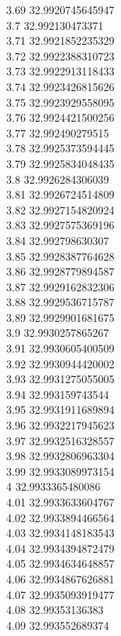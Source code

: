 {3.69	32.9920745645947\\
3.7	32.992130473371\\
3.71	32.9921852235329\\
3.72	32.9922388310723\\
3.73	32.9922913118433\\
3.74	32.9923426815626\\
3.75	32.9923929558095\\
3.76	32.9924421500256\\
3.77	32.992490279515\\
3.78	32.9925373594445\\
3.79	32.9925834048435\\
3.8	32.9926284306039\\
3.81	32.9926724514809\\
3.82	32.9927154820924\\
3.83	32.9927575369196\\
3.84	32.992798630307\\
3.85	32.9928387764628\\
3.86	32.9928779894587\\
3.87	32.9929162832306\\
3.88	32.9929536715787\\
3.89	32.9929901681675\\
3.9	32.9930257865267\\
3.91	32.9930605400509\\
3.92	32.9930944420002\\
3.93	32.9931275055005\\
3.94	32.993159743544\\
3.95	32.9931911689894\\
3.96	32.9932217945623\\
3.97	32.9932516328557\\
3.98	32.9932806963304\\
3.99	32.9933089973154\\
4	32.9933365480086\\
4.01	32.9933633604767\\
4.02	32.9933894466564\\
4.03	32.9934148183543\\
4.04	32.9934394872479\\
4.05	32.9934634648857\\
4.06	32.9934867626881\\
4.07	32.9935093919477\\
4.08	32.99353136383\\
4.09	32.993552689374\\
}
